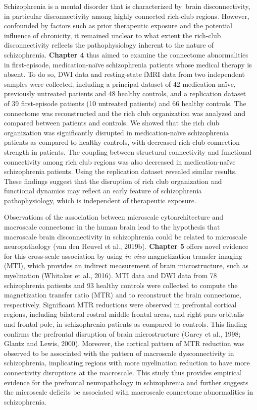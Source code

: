 \begin{refsection}
Schizophrenia is a mental disorder that is characterized by brain disconnectivity, in particular disconnectivity among highly connected rich-club regions. However, confounded by factors such as prior therapeutic exposure and the potential influence of chronicity, it remained unclear to what extent the rich-club disconnectivity reflects the pathophysiology inherent to the nature of schizophrenia. \textbf{Chapter 4} thus aimed to examine the connectome abnormalities in first-episode, medication-naïve schizophrenia patients whose medical therapy is absent. To do so, DWI data and resting-state fMRI data from two independent samples were collected, including a principal dataset of 42 medication-naïve, previously untreated patients and 48 healthy controls, and a replication dataset of 39 first-episode patients (10 untreated patients) and 66 healthy controls. The connectome was reconstructed and the rich club organization was analyzed and compared between patients and controls. We showed that the rich club organization was significantly disrupted in medication-naïve schizophrenia patients as compared to healthy controls, with decreased rich-club connection strength in patients. The coupling between structural connectivity and functional connectivity among rich club regions was also decreased in medication-naïve schizophrenia patients. Using the replication dataset revealed similar results. These findings suggest that the disruption of rich club organization and functional dynamics may reflect an early feature of schizophrenia pathophysiology, which is independent of therapeutic exposure.

Observations of the association between microscale cytoarchitecture and macroscale connectome in the human brain lead to the hypothesis that macroscale brain disconnectivity in schizophrenia could be related to microscale neuropathology (van den Heuvel et al., 2019b). \textbf{Chapter 5} offers novel evidence for this cross-scale association by using \textit{in vivo} magnetization transfer imaging (MTI), which provides an indirect measurement of brain microstructure, such as myelination (Whitaker et al., 2016). MTI data and DWI data from 78 schizophrenia patients and 93 healthy controls were collected to compute the magnetization transfer ratio (MTR) and to reconstruct the brain connectome, respectively. Significant MTR reductions were observed in prefrontal cortical regions, including bilateral rostral middle frontal areas, and right pars orbitalis and frontal pole, in schizophrenia patients as compared to controls. This finding confirms the prefrontal disruption of brain microstructure (Garey et al., 1998; Glantz and Lewis, 2000). Moreover, the cortical pattern of MTR reduction was observed to be associated with the pattern of macroscale dysconnectivity in schizophrenia, implicating regions with more myelination reduction to have more connectivity disruptions at the macroscale. This study thus provides empirical evidence for the prefrontal neuropathology in schizophrenia and further suggests the microscale deficits be associated with macroscale connectome abnormalities in schizophrenia.


\end{refsection}
